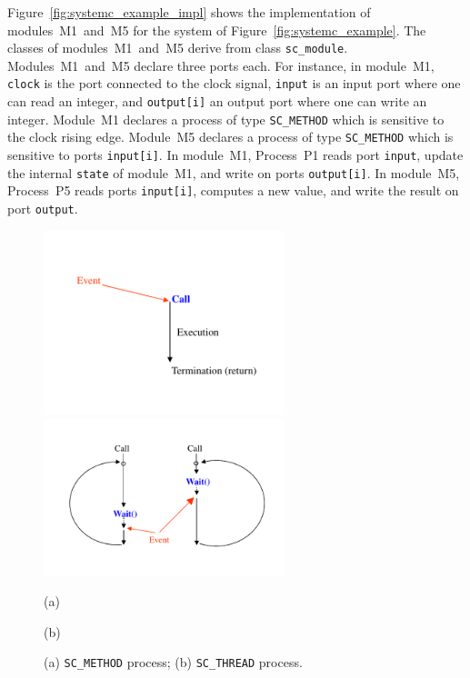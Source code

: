 {Figure~\ref{fig:systemc_example_impl} shows the implementation of modules~M1~and~M5 for the system of Figure~\ref{fig:systemc_example}.
The classes of modules~M1~and~M5 derive from class \texttt{sc\_module}. Modules~M1~and~M5 declare three ports each.
For instance, in module~M1, \texttt{clock} is the port connected to the clock signal, \texttt{input} is an input port where one can read an integer, and \texttt{output[i]} an output port where one can write an integer.
Module~M1 declares a process of type \texttt{SC\_METHOD} which is sensitive to the clock rising edge.
Module~M5 declares a process of type \texttt{SC\_METHOD} which is sensitive to ports \texttt{input[i]}.
In module~M1, Process~P1 reads port \texttt{input}, update the internal \texttt{state} of module~M1, and write on ports \texttt{output[i]}.
In module~M5, Process~P5 reads ports \texttt{input[i]}, computes a new value, and write the result on port \texttt{output}.

\begin{figure}[!h]
\begin{minipage}{\textwidth}
\begin{minipage}{7.0cm}
\begin{center}
\includegraphics[width=7.0cm]{systemc_cycle/method.pdf}
\end{center}
\end{minipage}
\begin{minipage}{7.0cm}
\begin{center}
\includegraphics[width=7.0cm]{systemc_cycle/threads.pdf}
\end{center}
\end{minipage} 
\begin{minipage}{7.0cm}
\begin{center}
(a)
\end{center}
\end{minipage}
\begin{minipage}{7.0cm}
\begin{center}
(b)
\end{center}
\end{minipage}
\caption{\label{fig:process} \small (a) \texttt{SC\_METHOD} process; (b) \texttt{SC\_THREAD} process.}
\end{minipage}
\end{figure}
}

